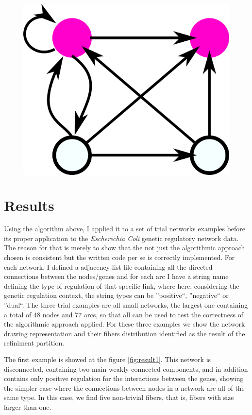 \documentclass[12pt]{diazessay} %
\begin{document}
\begin{figure}[H]
	\centering
	\includegraphics[scale=0.32]{Figures/input.png}
\end{figure}


\section*{Results}

Using the algorithm above, I applied it to a set of trial networks examples before its proper application to the \textit{Escherechia Coli} genetic regulatory network data. The reason for that is merely to show that the not just the algorithmic approach chosen is consistent but the written code per se is correctly implemented. For each network, I defined a adjacency list file containing all the directed connections between the nodes/genes and for each arc I have a string name defining the type of regulation of that specific link, where here, considering the genetic regulation context, the string types can be ''positive``, ''negative`` or ''dual``. The three trial examples are all small networks, the largest one containing a total of $48$ nodes and $77$ arcs, so that all can be used to test the correctness of the algorithmic approach applied. For these three examples we show the network drawing representation and their fibers distribution identified as the result of the refiniment partition.

The first example is showed at the figure \ref{fig:result1}. This network is disconnected, containing two main weakly connected components, and in addition contains only positive regulation for the interactions between the genes, showing the simpler case where the connections between nodes in a network are all of the same type. In this case, we find five non-trivial fibers, that is, fibers with size larger than one.
\end{document}
